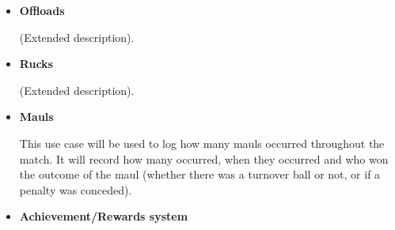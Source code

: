 \documentclass[a4paper,12pt]{report}
\begin{document}
\begin{itemize}
\begin{flushleft}
		\end{flushleft}
		\begin{center}
		\end{center}
	\item \textbf{Offloads}
		\begin{flushleft}
		(Extended description).
		\end{flushleft}
		\begin{center}
		\end{center}
	\item \textbf{Rucks}
		\begin{flushleft}
		(Extended description).
		\end{flushleft}
		\begin{center}
		\end{center}
	\item \textbf{Mauls}
		\begin{flushleft}
			This use case will be used to log how many mauls occurred throughout the match. It will record how many occurred, when they occurred and who won the outcome of the maul (whether there was a turnover ball or not, or if a penalty was conceded).
		\end{flushleft}
		\begin{center}
		\end{center}
	\item \textbf{Achievement/Rewards system}
		\begin{flushleft}
		\end{flushleft}
\end{itemize}
\end{document}
